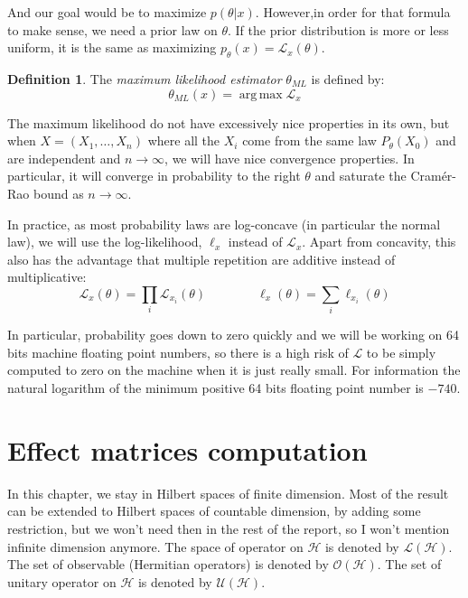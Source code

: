\documentclass[10pt]{report}
\theoremstyle{plain}
\theoremstyle{definition}
\newtheorem{defn}{Definition}[chapter]
\theoremstyle{remark}
\DeclareMathOperator{\argmax}{arg\,max}
\newcommand{\ml}{_{M\!L}}
\begin{document}
And our goal would be to maximize $p(\theta|x)$. However,in order for that
formula to make sense, we need a prior law on $\theta$. If the prior
distribution is more or less uniform, it is the same as maximizing $p_\theta(x)
= \mathcal{L}_x(\theta)$.


\begin{defn}
  The \emph{maximum likelihood estimator} $\theta\ml$ is defined by:
  \[\theta\ml(x) = \argmax \mathcal{L}_x\]
\end{defn}

The maximum likelihood do not have excessively nice properties in its own, but
when $X = (X_1,\ldots,X_n)$ where all the $X_i$ come from the same law
$P_\theta(X_0)$ and are independent and $n \to \infty$,
we will have nice convergence properties. In particular, it will converge in
probability to the right
$\theta$ and saturate the Cramér-Rao bound as $n \to \infty$.
\

In practice, as most probability laws are log-concave (in particular the normal
law), we will use the log-likelihood, $\ell_x$ instead of $\mathcal{L}_x$. Apart
from concavity, this also has the advantage that multiple repetition are
additive instead of multiplicative:
\[\mathcal{L}_x(\theta) = \prod_i \mathcal{L}_{x_i}(\theta) \quad \quad \quad
  \quad \ell_x(\theta) = \sum_i \ell_{x_i}(\theta)\]

In particular, probability goes down to zero quickly and we will be working on
64 bits machine floating point numbers, so there is a high risk of $\mathcal{L}$ to
be simply computed to zero on the machine when it is just really small. For
information the natural logarithm of the minimum positive 64 bits floating point number
is $-740$.





\chapter{Effect matrices computation}

In this chapter, we stay in Hilbert spaces of finite dimension. Most of the
result can be extended to Hilbert spaces of countable dimension, by adding
some restriction,
but we won't need then in the rest of the report, so I won't mention infinite
dimension anymore. The space of operator on
$\mathcal{H}$ is denoted by $\mathcal{L}(\mathcal{H})$. The set of observable
(Hermitian operators) is denoted by $\mathcal{O}(\mathcal{H})$. The set of
unitary operator on $\mathcal{H}$ is denoted by $\mathcal{U}(\mathcal{H})$.
\end{document}
